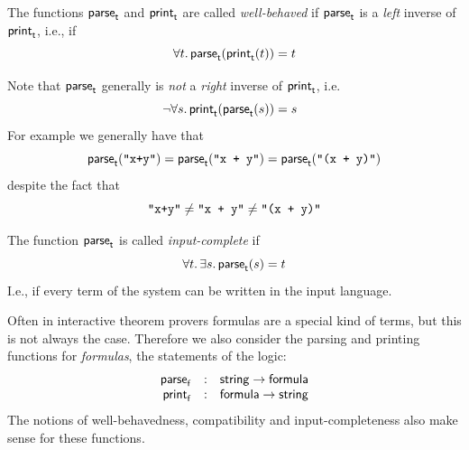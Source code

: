 \documentclass{entcs}
\begin{document}
\begin{definition}
\label{well-behaved}
The functions ${\sf parse}_{\sf t}$ and ${\sf print}_{\sf t}$ are called \emph{well-behaved} if
${\sf parse}_{\sf t}$ is a \emph{left} inverse of ${\sf print}_{\sf t}$, i.e., if
$$\forall t.\,{\sf parse}_{\sf t}({\sf print}_{\sf t}(t)) = t$$
\end{definition}

\noindent
Note that ${\sf parse}_{\sf t}$ generally is \emph{not} a \emph{right} inverse of ${\sf print}_{\sf t}$, i.e.
$$\llap{$\neg$}\forall s.\,{\sf print}_{\sf t}({\sf parse}_{\sf t}(s)) = s$$
For example we generally have that
$${\sf parse}_{\sf t}(\mbox{\tt \char`\"x+y\char`\"}) = {\sf parse}_{\sf t}(\mbox{\tt \char`\"x + y\char`\"}) = {\sf parse}_{\sf t}(\mbox{\tt \char`\"(x + y)\char`\"})$$
despite the fact that
$$\mbox{\tt \char`\"x+y\char`\"} \ne \mbox{\tt \char`\"x + y\char`\"} \ne \mbox{\tt \char`\"(x + y)\char`\"}\vspace{-\bigskipamount}$$
\begin{definition}\label{input-complete}
The function ${\sf parse}_{\sf t}$ is called \emph{input-complete} if
$$\forall t.\, \exists s.\, {\sf parse}_{\sf t}(s) = t$$
I.e., if every term of the system can be written in the input language.
\end{definition}

\noindent
Often in interactive theorem provers formulas are a special kind of terms,
but this is not always the case.
Therefore we also consider the parsing and printing functions for \emph{formulas},
the statements of the logic:
$$
\begin{array}{rcl}
{\sf parse}_{\sf f} &:& {\sf string} \to {\sf formula} \\
{\sf print}_{\sf f} &:& {\sf formula} \to {\sf string}
\end{array}
$$
The notions of well-behavedness, compatibility and input-completeness also make sense for
these functions.
\end{document}
